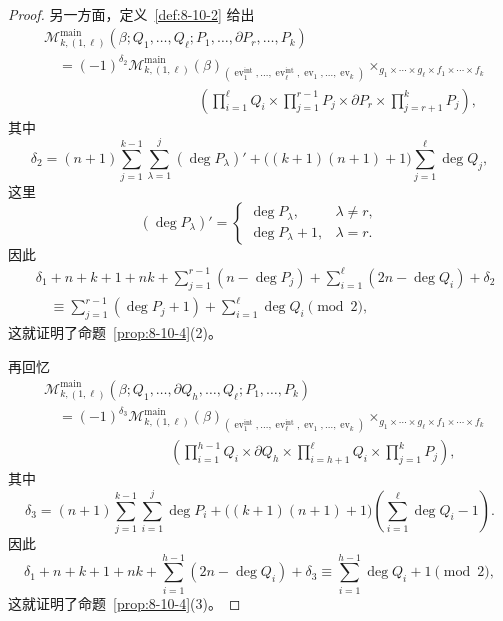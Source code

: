 \begin{proof}
另一方面，定义~\ref{def:8-10-2} 给出
\begingroup
\small
\[
\begin{aligned}
&\mathcal M_{k,(1,\ell)}^{\mathrm{main}}
(\beta;Q_1,\ldots,Q_\ell;P_1,\ldots,\partial P_r,\ldots,P_k)\\
&\quad={}
(-1)^{\delta_2}
\mathcal M_{k,(1,\ell)}^{\mathrm{main}}(\beta)_
{(\operatorname{ev}_1^{\mathrm{int}},\ldots,
\operatorname{ev}_\ell^{\mathrm{int}},
\operatorname{ev}_1,\ldots,\operatorname{ev}_k)}
\mathop{\times}_{g_1\times\cdots\times g_\ell
\times f_1\times\cdots\times f_k}\\[-2pt]
&\hspace{11em}{}
\left(\prod_{i=1}^{\ell}Q_i\times
\prod_{j=1}^{r-1}P_j\times\partial P_r\times
\prod_{j=r+1}^{k}P_j\right),
\end{aligned}
\]
\endgroup
其中
\[
 \delta_2=(n+1)
 \sum_{j=1}^{k-1}\sum_{\lambda=1}^{j}(\deg P_\lambda)'
 +\bigl((k+1)(n+1)+1\bigr)\sum_{j=1}^{\ell}\deg Q_j,
\]
这里
\[
 (\deg P_\lambda)'=
 \begin{cases}
 \deg P_\lambda,&\lambda\ne r,\\
 \deg P_\lambda+1,&\lambda=r.
 \end{cases}
\]
因此
\[
\begin{aligned}
&\delta_1+n+k+1+nk
+\sum_{j=1}^{r-1}(n-\deg P_j)
+\sum_{i=1}^{\ell}(2n-\deg Q_i)+\delta_2\\
&\quad\equiv
\sum_{j=1}^{r-1}(\deg P_j+1)
+\sum_{i=1}^{\ell}\deg Q_i\pmod2,
\end{aligned}
\]
这就证明了命题~\ref{prop:8-10-4}(2)。

再回忆
\begingroup
\small
\[
\begin{aligned}
&\mathcal M_{k,(1,\ell)}^{\mathrm{main}}
(\beta;Q_1,\ldots,\partial Q_h,\ldots,Q_\ell;P_1,\ldots,P_k)\\
&\quad={}
(-1)^{\delta_3}
\mathcal M_{k,(1,\ell)}^{\mathrm{main}}(\beta)_
{(\operatorname{ev}_1^{\mathrm{int}},\ldots,
\operatorname{ev}_\ell^{\mathrm{int}},
\operatorname{ev}_1,\ldots,\operatorname{ev}_k)}
\mathop{\times}_{g_1\times\cdots\times g_\ell
\times f_1\times\cdots\times f_k}\\[-2pt]
&\hspace{9em}{}
\left(\prod_{i=1}^{h-1}Q_i\times\partial Q_h\times
\prod_{i=h+1}^{\ell}Q_i\times\prod_{j=1}^{k}P_j\right),
\end{aligned}
\]
\endgroup
其中
\[
 \delta_3=(n+1)\sum_{j=1}^{k-1}\sum_{i=1}^{j}\deg P_i
 +\bigl((k+1)(n+1)+1\bigr)
 \left(\sum_{i=1}^{\ell}\deg Q_i-1\right).
\]
因此
\[
 \delta_1+n+k+1+nk
 +\sum_{i=1}^{h-1}(2n-\deg Q_i)+\delta_3
 \equiv\sum_{i=1}^{h-1}\deg Q_i+1\pmod2,
\]
这就证明了命题~\ref{prop:8-10-4}(3)。
\end{proof}

